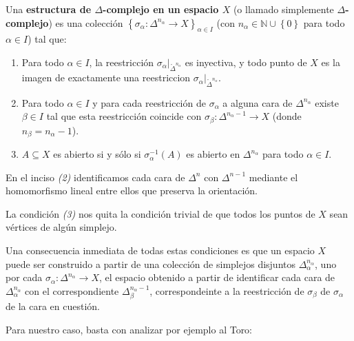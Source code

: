\documentclass[12pt]{report}
\newcounter{it}
\theoremstyle{largebreak}
\newcommand\cf[3]{\ensuremath{#1:#2\rightarrow#3}}
\begin{document}
    \begin{mydef}
        Una \textbf{estructura de $\Delta$-complejo en un espacio $X$} (o llamado simplemente \textbf{$\Delta$-complejo}) es una colección $\left\{\cf{\sigma_\alpha}{\Delta^{ n_\alpha}}{X} \right\}_{\alpha\in I}$ (con $n_\alpha\in\mathbb{N}\cup\left\{0 \right\}$ para todo $\alpha\in I$) tal que:
        \begin{enumerate}[label = \textit{(\arabic*)}]
            \item Para todo $\alpha\in I$, la reestricción $\sigma_\alpha\big|_{\mathring{\Delta}^{ n_\alpha}}$ es inyectiva, y todo punto de $X$ es la imagen de exactamente una reestriccion $\sigma_\alpha\big|_{\mathring{\Delta}^{ n_\alpha}}$.
            \item Para todo $\alpha\in I$ y para cada reestricción de $\sigma_\alpha$ a alguna cara de $\Delta^{ n_\alpha}$ existe $\beta\in I$ tal que esta reestricción coincide con $\cf{\sigma_\beta}{\Delta^{ n_\alpha-1}}{X}$ (donde $n_\beta=n_\alpha-1$).
            \item $A\subseteq X$ es abierto si y sólo si $\sigma_\alpha^{-1}(A)$ es abierto en $\Delta^{n_\alpha}$ para todo $\alpha\in I$.
        \end{enumerate}
    \end{mydef}

    \begin{obs}
        En el inciso \textit{(2)} identificamos cada cara de $\Delta^n$ con $\Delta^{ n-1}$ mediante el homomorfismo lineal entre ellos que preserva la orientación.
    \end{obs}

    La condición \textit{(3)} nos quita la condición trivial de que todos los puntos de $X$ sean vértices de algún simplejo.

    Una consecuencia inmediata de todas estas condiciones es que un espacio $X$ puede ser construido a partir de una colección de simplejos disjuntos $\Delta_\alpha^{n_\alpha}$, uno por cada $\cf{\sigma_\alpha}{\Delta^{ n_\alpha}}{X}$, el espacio obtenido a partir de identificar cada cara de $\Delta_\alpha^{ n_\alpha}$ con el correspondiente $\Delta_\beta^{ n_\alpha-1}$, correspondeinte a la reestricción de $\sigma_\beta$ de $\sigma_\alpha$ de la cara en cuestión.

    Para nuestro caso, basta con analizar por ejemplo al Toro:

    \begin{exa}
    \end{exa}
\end{document}
